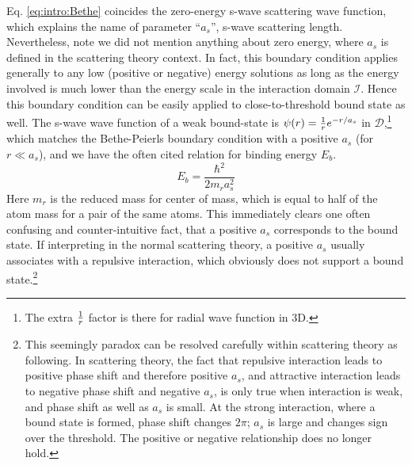Eq. \ref{eq:intro:Bethe} coincides the zero-energy s-wave scattering wave function, which explains the name of parameter ``$a_s$'', s-wave scattering length. Nevertheless,   note we did not mention anything about zero energy, where $a_{s}$ is defined in the scattering theory context.  In fact,  this boundary condition applies generally to  any low (positive or negative) energy solutions as long as the energy involved is much lower than the energy scale in the interaction domain $\mathcal{I}$.  Hence this boundary condition can be easily  applied  to close-to-threshold bound state as well.  The s-wave wave function of a weak bound-state is $\psi(r)=\frac{1}{r}e^{-r/a_s}$ in $\mathcal{D}$,\footnote{The extra $\frac{1}{r}$ factor is there for  radial wave function in 3D.} which matches the Bethe-Peierls boundary condition with a positive $a_{s}$ (for  $r\ll{}a_{s}$), and we have the often cited relation for binding energy $E_{b}$.
\begin{equation}
 E_{b}=\frac{\hbar^{2}}{2m_{r}a_{s}^{2}}
\end{equation}
Here $m_{r}$ is the reduced mass for center of mass, which is equal to half of the atom mass for a pair of the same atoms.  This immediately clears one often confusing and counter-intuitive fact, that a positive  $a_s$ corresponds to the bound state.  If interpreting in the normal scattering theory, a positive $a_s$  usually associates with a repulsive interaction, which obviously does not support a bound state.\footnote{This seemingly paradox can be resolved carefully within scattering theory as following. In scattering theory, the fact that  repulsive interaction leads to positive phase shift and therefore positive $a_s$, and attractive interaction leads to negative phase shift and negative $a_s$, is only true when interaction is weak, and phase shift as well as $a_s$ is small.  At the strong interaction, where a bound state is formed, phase shift changes $2\pi$; $a_s$ is large and  changes sign over the threshold. The positive or negative relationship does no longer hold.}

